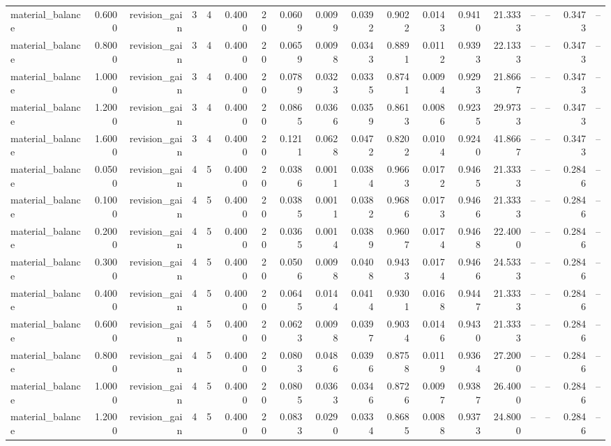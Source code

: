 \begin{table}[htbp]
\begin{tabular}{lrrrrrrrrrrrrrrrrr}
material\_balance & 0.6000 & revision\_gain & 3 & 4 & 0.4000 & 20 & 0.0609 & 0.0099 & 0.0392 & 0.9022 & 0.0143 & 0.9410 & 21.3333 & -- & -- & 0.3473 & -- \\
material\_balance & 0.8000 & revision\_gain & 3 & 4 & 0.4000 & 20 & 0.0659 & 0.0098 & 0.0343 & 0.8891 & 0.0112 & 0.9393 & 22.1333 & -- & -- & 0.3473 & -- \\
material\_balance & 1.0000 & revision\_gain & 3 & 4 & 0.4000 & 20 & 0.0789 & 0.0323 & 0.0335 & 0.8741 & 0.0094 & 0.9293 & 21.8667 & -- & -- & 0.3473 & -- \\
material\_balance & 1.2000 & revision\_gain & 3 & 4 & 0.4000 & 20 & 0.0865 & 0.0366 & 0.0359 & 0.8613 & 0.0086 & 0.9235 & 29.9733 & -- & -- & 0.3473 & -- \\
material\_balance & 1.6000 & revision\_gain & 3 & 4 & 0.4000 & 20 & 0.1211 & 0.0628 & 0.0472 & 0.8202 & 0.0104 & 0.9240 & 41.8667 & -- & -- & 0.3473 & -- \\
material\_balance & 0.0500 & revision\_gain & 4 & 5 & 0.4000 & 20 & 0.0386 & 0.0011 & 0.0384 & 0.9663 & 0.0172 & 0.9465 & 21.3333 & -- & -- & 0.2846 & -- \\
material\_balance & 0.1000 & revision\_gain & 4 & 5 & 0.4000 & 20 & 0.0385 & 0.0011 & 0.0382 & 0.9686 & 0.0173 & 0.9466 & 21.3333 & -- & -- & 0.2846 & -- \\
material\_balance & 0.2000 & revision\_gain & 4 & 5 & 0.4000 & 20 & 0.0365 & 0.0014 & 0.0389 & 0.9607 & 0.0174 & 0.9468 & 22.4000 & -- & -- & 0.2846 & -- \\
material\_balance & 0.3000 & revision\_gain & 4 & 5 & 0.4000 & 20 & 0.0506 & 0.0098 & 0.0408 & 0.9433 & 0.0174 & 0.9466 & 24.5333 & -- & -- & 0.2846 & -- \\
material\_balance & 0.4000 & revision\_gain & 4 & 5 & 0.4000 & 20 & 0.0645 & 0.0144 & 0.0414 & 0.9301 & 0.0168 & 0.9447 & 21.3333 & -- & -- & 0.2846 & -- \\
material\_balance & 0.6000 & revision\_gain & 4 & 5 & 0.4000 & 20 & 0.0623 & 0.0098 & 0.0397 & 0.9034 & 0.0146 & 0.9430 & 21.3333 & -- & -- & 0.2846 & -- \\
material\_balance & 0.8000 & revision\_gain & 4 & 5 & 0.4000 & 20 & 0.0803 & 0.0486 & 0.0396 & 0.8758 & 0.0119 & 0.9364 & 27.2000 & -- & -- & 0.2846 & -- \\
material\_balance & 1.0000 & revision\_gain & 4 & 5 & 0.4000 & 20 & 0.0805 & 0.0363 & 0.0346 & 0.8726 & 0.0097 & 0.9387 & 26.4000 & -- & -- & 0.2846 & -- \\
material\_balance & 1.2000 & revision\_gain & 4 & 5 & 0.4000 & 20 & 0.0833 & 0.0290 & 0.0334 & 0.8685 & 0.0088 & 0.9373 & 24.8000 & -- & -- & 0.2846 & -- \\

\end{tabular}
\end{table}
